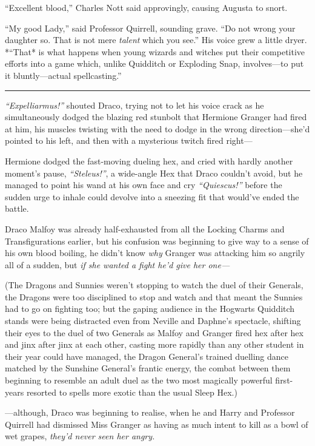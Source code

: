 ``Excellent blood,'' Charles Nott said approvingly, causing Augusta to
snort.

``My good Lady,'' said Professor Quirrell, sounding grave. ``Do not
wrong your daughter so. That is not mere \emph{talent} which you see.''
His voice grew a little dryer. *``That* is what happens when young
wizards and witches put their competitive efforts into a game which,
unlike Quidditch or Exploding Snap, involves---to put it
bluntly---actual spellcasting.''

\begin{center}\rule{3in}{0.4pt}\end{center}

\emph{``Expelliarmus!''} shouted Draco, trying not to let his voice
crack as he simultaneously dodged the blazing red stunbolt that Hermione
Granger had fired at him, his muscles twisting with the need to dodge in
the wrong direction---she'd pointed to his left, and then with a
mysterious twitch fired right---

Hermione dodged the fast-moving dueling hex, and cried with hardly
another moment's pause, \emph{``Steleus!''}, a wide-angle Hex that Draco
couldn't avoid, but he managed to point his wand at his own face and cry
\emph{``Quiescus!''} before the sudden urge to inhale could devolve into
a sneezing fit that would've ended the battle.

Draco Malfoy was already half-exhausted from all the Locking Charms and
Transfigurations earlier, but his confusion was beginning to give way to
a sense of his own blood boiling, he didn't know \emph{why} Granger was
attacking him so angrily all of a sudden, but \emph{if she wanted a
fight he'd give her one---}

(The Dragons and Sunnies weren't stopping to watch the duel of their
Generals, the Dragons were too disciplined to stop and watch and that
meant the Sunnies had to go on fighting too; but the gaping audience in
the Hogwarts Quidditch stands were being distracted even from Neville
and Daphne's spectacle, shifting their eyes to the duel of two Generals
as Malfoy and Granger fired hex after hex and jinx after jinx at each
other, casting more rapidly than any other student in their year could
have managed, the Dragon General's trained duelling dance matched by the
Sunshine General's frantic energy, the combat between them beginning to
resemble an adult duel as the two most magically powerful first-years
resorted to spells more exotic than the usual Sleep Hex.)

---although, Draco was beginning to realise, when he and Harry and
Professor Quirrell had dismissed Miss Granger as having as much intent
to kill as a bowl of wet grapes, \emph{they'd never seen her angry.}

